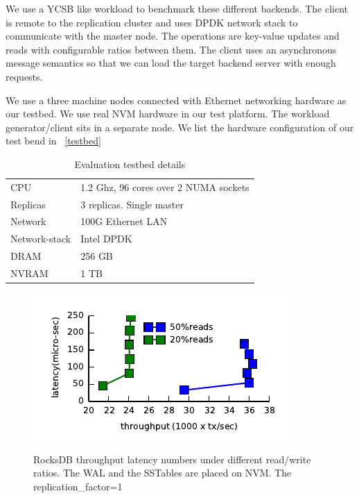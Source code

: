 We use a YCSB like workload to benchmark these different backends. The client is remote to the replication
cluster and uses DPDK network stack to communicate with the master node. The operations are key-value updates and
reads with configurable ratios between them. The client uses an asynchronous message semantics so that we can
load the target backend server with enough requests.

We use a three machine nodes connected with Ethernet networking hardware as our testbed. We use real NVM hardware
in our test platform. The workload generator/client sits in a separate node. We list the hardware configuration of
our test bend in ~\autoref{testbed}
\begin{table}[h!]
	\centering
	\begin{tabular}{l|l}
		\hline
		CPU & 1.2 Ghz, 96 cores over 2 NUMA sockets \\
		Replicas & 3 replicas. Single master \\
		Network & 100G Ethernet LAN \\
		Network-stack & Intel DPDK \\
		DRAM & 256 GB \\
		NVRAM & 1 TB \\
	\end{tabular}
	\caption{Evaluation testbed details}
	\label{testbed}
\end{table}


\begin{figure}[tbp]   
	\centering
	\includegraphics[width=\linewidth]{plot/rocksdbcompare.pdf} 
	\caption{\small RocksDB throughput latency numbers under different read/write ratios. The WAL and the SSTables are placed on NVM. The replication\_factor=1} 
	\label{plot:rocksdb} 
\end{figure}

